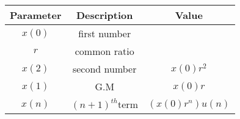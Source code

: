 \begin{tabular}{|c|c|c|}
        \hline
        \textbf{Parameter} & \textbf{Description} &\textbf{Value}\\
        \hline
        $x(0)$ & first number& \\
         \hline
        $r$ & common ratio &\\
        \hline
        $x(2)$ & second number & $x(0)r^2$\\
        \hline
        $x(1)$ & G.M & $x(0)r$\\
        \hline
        $x(n)$ & $(n + 1)^{th}$term & $(x(0)r^n)u(n)$\\
        \hline
    \end{tabular}
